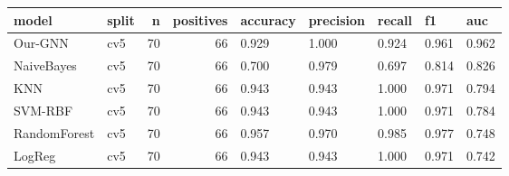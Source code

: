 \begin{tabular}{llrrlllll}
\toprule
model & split & n & positives & accuracy & precision & recall & f1 & auc \\
\midrule
Our-GNN & cv5 & 70 & 66 & 0.929 & 1.000 & 0.924 & 0.961 & 0.962 \\
NaiveBayes & cv5 & 70 & 66 & 0.700 & 0.979 & 0.697 & 0.814 & 0.826 \\
KNN & cv5 & 70 & 66 & 0.943 & 0.943 & 1.000 & 0.971 & 0.794 \\
SVM-RBF & cv5 & 70 & 66 & 0.943 & 0.943 & 1.000 & 0.971 & 0.784 \\
RandomForest & cv5 & 70 & 66 & 0.957 & 0.970 & 0.985 & 0.977 & 0.748 \\
LogReg & cv5 & 70 & 66 & 0.943 & 0.943 & 1.000 & 0.971 & 0.742 \\
\bottomrule
\end{tabular}
